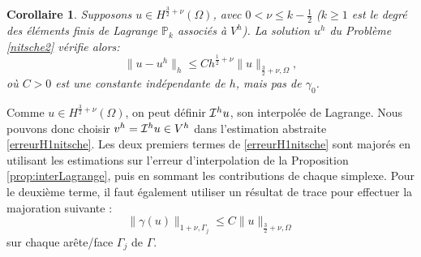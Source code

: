 \documentclass[11pt]{book}
\newtheorem{corollary}[theorem]{Corollaire}
\newcommand{\be}{\begin{equation}}
\newcommand{\ee}{\end{equation}}
\newcommand{\bc}{\begin{corollary}}
\newcommand{\ec}{\end{corollary}}
\newcommand{\caI}{{\cal I}}
\newcommand{\PP}{\mathbb{P}}
\begin{document}
\bc \label{cvoptNitscheD} Supposons $u \in H^{\frac32+\nu} (\Omega)$, avec $0 < \nu \leq k-\frac12$ ($k \geq 1$ est le degré des éléments finis de Lagrange $\PP_k$ associés à $V^h$). La solution $u^h$ du Problème \eqref{nitsche2} vérifie alors:
\be \label{erreurH1lagrangenitsche}
 \| u - u^h \|_{h} \leq C h^{\frac12+\nu} \| u \|_{\frac32+\nu,\Omega},
\ee
où $C>0$ est une constante indépendante de $h$, mais pas de $\gamma_0$.
\ec

\proof Comme $u \in H^{\frac32+\nu} (\Omega)$, on peut définir $\caI^h u$, son interpolée de Lagrange. Nous pouvons donc choisir $v^h = \caI^h u \in V^h$ dans l'estimation abstraite \eqref{erreurH1nitsche}. 
Les deux premiers termes de \eqref{erreurH1nitsche} sont majorés en utilisant les estimations sur l'erreur d'interpolation de la Proposition \ref{prop:interLagrange}, puis en sommant les contributions de chaque simplexe. Pour le deuxième terme, il faut également utiliser un résultat de trace pour effectuer la majoration suivante :
\[
 \| \gamma (u) \|_{1+\nu,\Gamma_j} \leq C \| u \|_{\frac32+\nu,\Omega}
\]
sur chaque arête/face $\Gamma_j$ de $\Gamma$.
\end{document}
